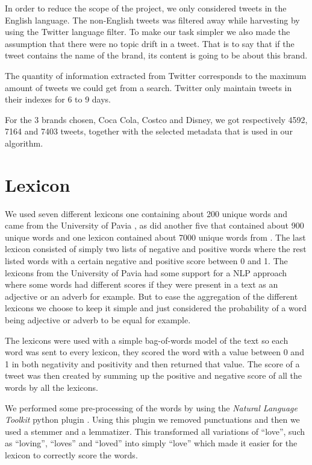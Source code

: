 \documentclass[a4paper,12pt]{report}
\begin{document}
In order to reduce the scope of the project, we only considered tweets in the English language. 
The non-English tweets was filtered away while harvesting by using the Twitter language filter.
To make our task simpler we also made the assumption that there were no topic drift in a tweet. 
That is to say that if the tweet contains the name of the brand, its content is going to be about this brand.

The quantity of information extracted from Twitter corresponds to the maximum amount of tweets we could get from a search.
Twitter only maintain tweets in their indexes for 6 to 9 days.\cite{Twitter}

For the 3 brands chosen, Coca Cola, Costco and Disney, we got respectively 4592, 7164 and 7403 tweets, together with the selected metadata that is used in our algorithm.

\section{Lexicon}

We used seven different lexicons one containing about 200 unique words and came from the University of Pavia \cite{WNOP07}, as did another five that contained about 900 unique words and one lexicon contained about 7000 unique words from \cite{Liu04}. 
The last lexicon consisted of simply two lists of negative and positive words where the rest listed words with a certain negative and positive score between 0 and 1. 
The lexicons from the University of Pavia had some support for a NLP approach where some words had different scores if they were present in a text as an adjective or an adverb for example.  
But to ease the aggregation of the different lexicons we choose to keep it simple and just considered the probability of a word being adjective or adverb to be equal for example.

The lexicons were used with a simple bag-of-words model of the text so each word was sent to every lexicon, they scored the word with a value between 0 and 1 in both negativity and positivity and then returned that value. 
The score of a tweet was then created by summing up the positive and negative score of all the words by all the lexicons.

We performed some pre-processing of the words by using the \textit{Natural Language Toolkit} python plugin \cite{NLTK}.
Using this plugin we removed punctuations and then we used a stemmer and a lemmatizer. This transformed all variations of ``love'', such as ``loving'', ``loves'' and ``loved'' into simply ``love'' which made it easier for the lexicon to correctly score the words.
\end{document}
